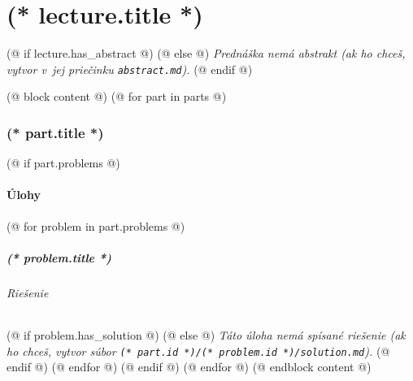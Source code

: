 \documentclass[12pt, twoside]{dgs}
\numberwithin{equation}{section}
\numberwithin{figure}{section}
\begin{document}
    \pagestyle{scholar}
    \part{(* lecture.title *)}%
    (@ if lecture.has_abstract @)
        \textit{}%
    (@ else @)
        \textit{Prednáška nemá abstrakt (ak ho chceš, vytvor v\ jej priečinku \texttt{abstract.md}).}
    (@ endif @)

    (@ block content @)
        (@ for part in parts @)
            \section{\texorpdfstring{(* part.title *)}{(* part.pdftitle|default(part.title) *)}}
                
                (@ if part.problems @)
                    \subsection{Úlohy}
                    (@ for problem in part.problems @)
                        \subsubsection{(* problem.title *)}
                            \paragraph{Riešenie}
                            (@ if problem.has_solution @)
                            (@ else @)
                                \textit{Táto úloha nemá spísané riešenie
                                    (ak ho chceš, vytvor súbor \texttt{(* part.id *)/(* problem.id *)/solution.md}).}
                            (@ endif @)
                    (@ endfor @)
                (@ endif @)
        (@ endfor @)
    (@ endblock content @)
\end{document}
